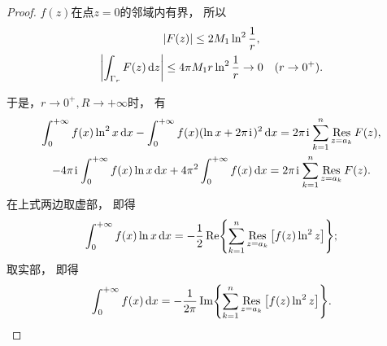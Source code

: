 \begin{theorem}
\begin{proof}
\(f(z)\)在点\(z=0\)的邻域内有界，
所以\begin{gather*}
	\abs{F(z)} \leq 2M_1 \ln^2 \frac{1}{r}, \\
	\abs{\int_{\Gamma_r} F(z) \dd{z}}
	\leq 4\pi M_1 r \ln^2 \frac{1}{r}
	\to 0 \quad(r\to0^+).
\end{gather*}

于是，\(r\to0^+, R\to+\infty\)时，
有\begin{gather*}
	\int_0^{+\infty} f(x) \ln^2 x \dd{x}
	- \int_0^{+\infty} f(x) (\ln x + 2\pi\kern1pt\mathrm{i}\kern1pt)^2 \dd{x}
	= 2\pi\kern1pt\mathrm{i}\kern1pt \sum_{k=1}^n \operatorname*{Res}_{z=a_k} F(z), \\
	-4\pi\kern1pt\mathrm{i}\kern1pt \int_0^{+\infty} f(x) \ln x \dd{x}
	+ 4\pi^2 \int_0^{+\infty} f(x) \dd{x}
	= 2\pi\kern1pt\mathrm{i}\kern1pt \sum_{k=1}^n \operatorname*{Res}_{z=a_k} F(z).
\end{gather*}
在上式两边取虚部，
即得\begin{equation}\label{equation:留数定理.利用留数定理计算实积分4.2}
	\int_0^{+\infty} f(x) \ln x \dd{x}
	= -\frac{1}{2} \Re{ \sum_{k=1}^n \operatorname*{Res}_{z=a_k} \left[ f(z) \ln^2 z \right] };
\end{equation}
取实部，
即得\begin{equation}\label{equation:留数定理.利用留数定理计算实积分4.3}
	\int_0^{+\infty} f(x) \dd{x}
	= -\frac{1}{2\pi} \Im{ \sum_{k=1}^n \operatorname*{Res}_{z=a_k} \left[ f(z) \ln^2 z \right] }.
\end{equation}
\end{proof}
\end{theorem}

